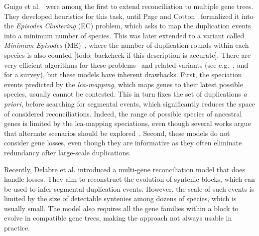 \documentclass[10pt]{article}
\newcommand{\ml}[1]{\begingroup\color{blue}#1\endgroup}
\newcommand{\rk}[1]{\begingroup\color{red}#1\endgroup}
\begin{document}
Guigo et al.~\cite{guigo1996reconstruction} were among the first to extend reconciliation to multiple gene trees.  They developed heuristics for this task, until Page and Cotton~\cite{page1994maps} formalized it into the \emph{Episodes Clustering} (EC) problem, which asks to map the duplication events into a minimum number of species.  This was later extended to a variant called \emph{Minimum Episodes} (ME)~\cite{bansal2008multiple}, where the number of duplication rounds within each species is also counted \ml{[todo: backcheck if this description is accurate]}.
There are very efficient algorithms for these problems~\cite{luo2009linear,mettanant2008linear,paszek2017efficient} and related variants (see e.g.~\cite{gorecki2024unifying}, and~\cite{paszek2017efficient} for a survey), but these models have inherent drawbacks.  First, the speciation events predicted by the \emph{lca-mapping}, which maps genes to their latest possible species, usually cannot be contested.  This in turn fixes the set of duplications \emph{a priori}, before searching for segmental events, which significantly reduces the space of considered reconciliations.  Indeed, the range of possible species of ancestral genes is limited by the lca-mapping speciations, even though several works argue that alternate scenarios should be explored~\cite{doyon2011efficient,arvestad2003bayesian}.  Second, these models do not consider gene losses, even though they are informative as they often eliminate redundancy after large-scale duplications.  

Recently, Delabre et al. \cite{delabre2018reconstructing,anselmetti2022reconciliation} introduced a multi-gene reconciliation model that does handle losses.  They aim to reconstruct the evolution of syntenic blocks, which can be used to infer segmental duplication events.  However, the scale of such events is limited by the size of detectable syntenies among dozens of species, which is usually small.  The model also requires all the gene families within a block to evolve in compatible gene trees, making the approach not always usable in practice.
\end{document}
